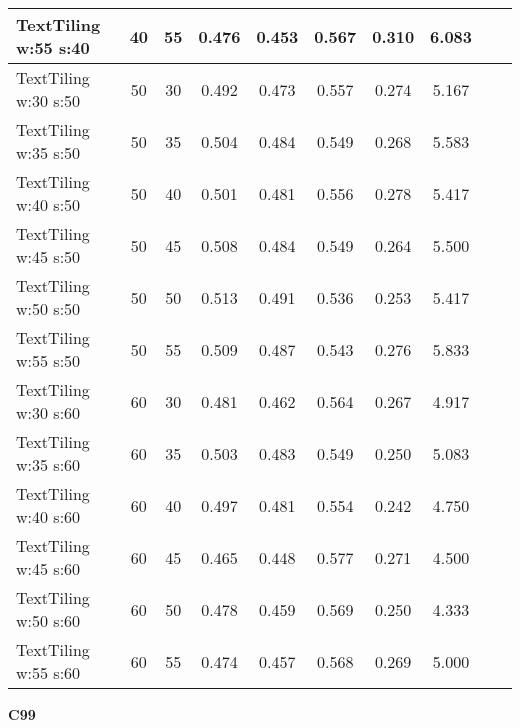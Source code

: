 \documentclass{article}
\begin{document}
\begin{longtable}[c]{|l|c|c|c|c|c|c|c|c|c|}
 TextTiling w:55 s:40 & 40 & 55 & 0.476 & 0.453 & 0.567 & 0.310 & 6.083  \\ \hline 
 TextTiling w:30 s:50 & 50 & 30 & 0.492 & 0.473 & 0.557 & 0.274 & 5.167  \\ \hline 
 TextTiling w:35 s:50 & 50 & 35 & 0.504 & 0.484 & 0.549 & 0.268 & 5.583  \\ \hline 
 TextTiling w:40 s:50 & 50 & 40 & 0.501 & 0.481 & 0.556 & 0.278 & 5.417  \\ \hline 
 TextTiling w:45 s:50 & 50 & 45 & 0.508 & 0.484 & 0.549 & 0.264 & 5.500  \\ \hline 
 TextTiling w:50 s:50 & 50 & 50 & 0.513 & 0.491 & 0.536 & 0.253 & 5.417  \\ \hline 
 TextTiling w:55 s:50 & 50 & 55 & 0.509 & 0.487 & 0.543 & 0.276 & 5.833  \\ \hline 
 TextTiling w:30 s:60 & 60 & 30 & 0.481 & 0.462 & 0.564 & 0.267 & 4.917  \\ \hline 
 TextTiling w:35 s:60 & 60 & 35 & 0.503 & 0.483 & 0.549 & 0.250 & 5.083  \\ \hline 
 TextTiling w:40 s:60 & 60 & 40 & 0.497 & 0.481 & 0.554 & 0.242 & 4.750  \\ \hline 
 TextTiling w:45 s:60 & 60 & 45 & 0.465 & 0.448 & 0.577 & 0.271 & 4.500  \\ \hline 
 TextTiling w:50 s:60 & 60 & 50 & 0.478 & 0.459 & 0.569 & 0.250 & 4.333  \\ \hline 
 TextTiling w:55 s:60 & 60 & 55 & 0.474 & 0.457 & 0.568 & 0.269 & 5.000  \\ \hline 
 \end{longtable} 



 \newpage
{  
\large
\center
	\textbf{C99}  

}
\end{document}
